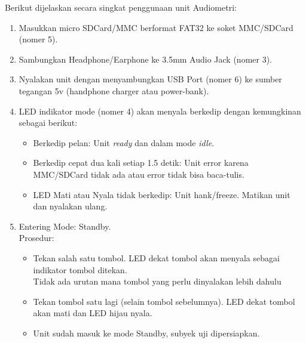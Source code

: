 \documentclass[12pt,]{article}
\begin{document}
	Berikut dijelaskan secara singkat penggunaan unit Audiometri:
	\begin{enumerate}
		\item Masukkan micro SDCard/MMC berformat FAT32 ke soket MMC/SDCard (nomer 5).
		
		\item Sambungkan Headphone/Earphone ke 3.5mm Audio Jack (nomer 3).
		
		\item Nyalakan unit dengan menyambungkan USB Port (nomer 6) ke sumber tegangan 5v (handphone charger atau power-bank).
		
		\item LED indikator mode (nomer 4) akan menyala berkedip dengan kemungkinan sebagai berikut:
		\begin{itemize}
			\item Berkedip pelan: Unit \textit{ready} dan dalam mode \textit{idle}.
			\item Berkedip cepat dua kali setiap 1.5 detik: Unit error karena MMC/SDCard tidak ada atau error tidak bisa baca-tulis.
			\item LED Mati atau Nyala tidak berkedip: Unit hank/freeze. Matikan unit dan nyalakan ulang.
		\end{itemize}
	
		\item Entering Mode: Standby.\\
		Prosedur:
		\begin{itemize}
			\item Tekan salah satu tombol. LED dekat tombol akan menyala sebagai indikator tombol ditekan.\\
			Tidak ada urutan mana tombol yang perlu dinyalakan lebih dahulu
			
			\item Tekan tombol satu lagi (selain tombol sebelumnya). LED dekat tombol akan mati dan LED hijau nyala.
			
			\item Unit sudah masuk ke mode Standby, subyek uji dipersiapkan.
		\end{itemize}
	

\end{enumerate}
\end{document}
